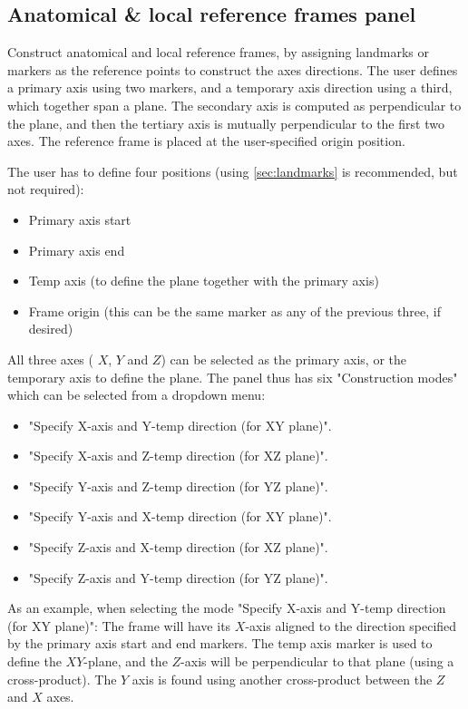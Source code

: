 \documentclass{article}
\begin{document}
\subsection{Anatomical \& local reference frames panel}

Construct anatomical and local reference frames, by assigning landmarks or markers as the reference points to construct the axes directions. The user defines a primary axis using two markers, and a temporary axis direction using a third, which together span a plane. The secondary axis is computed as perpendicular to the plane, and then the tertiary axis is mutually perpendicular to the first two axes. The reference frame is placed at the user-specified origin position.

The user has to define four positions (using \ref{sec:landmarks} is recommended, but not required):

\begin{itemize}
\item Primary axis start
\item Primary axis end
\item Temp axis (to define the plane together with the primary axis)
\item Frame origin (this can be the same marker as any of the previous three, if desired)
\end{itemize}

All three axes ( \(X\), \(Y\) and \(Z\)) can be selected as the primary axis, or the temporary axis to define the plane. The panel thus has six "Construction modes" which can be selected from a dropdown menu:

\begin{itemize}
    \item "Specify X-axis and Y-temp direction (for XY plane)".  
    \item "Specify X-axis and Z-temp direction (for XZ plane)".
    \item "Specify Y-axis and Z-temp direction (for YZ plane)".
    \item "Specify Y-axis and X-temp direction (for XY plane)".
    \item "Specify Z-axis and X-temp direction (for XZ plane)".
    \item "Specify Z-axis and Y-temp direction (for YZ plane)".
\end{itemize}


As an example, when selecting the mode "Specify X-axis and Y-temp direction (for XY plane)": The frame will have its \(X\)-axis aligned to the direction specified by the primary axis start and end markers. The temp axis marker is used to define the \(XY\)-plane, and the \(Z\)-axis will be perpendicular to that plane (using a cross-product). The \(Y\) axis is found using another cross-product between the \(Z\) and \(X\) axes.
\end{document}
